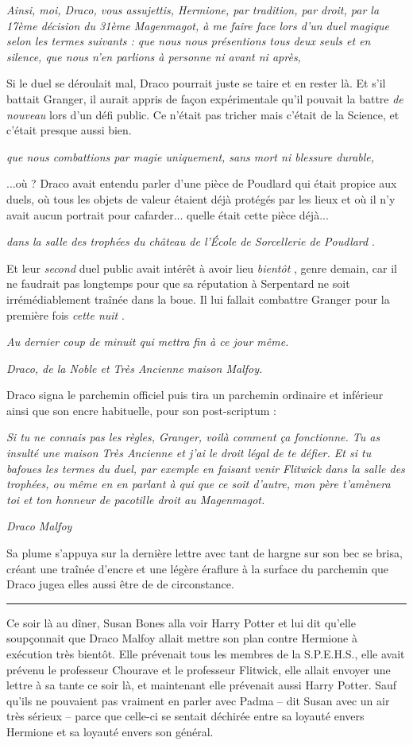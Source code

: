 \emph{Ainsi, moi, Draco, vous assujettis, Hermione, par tradition, par droit, par la 17ème décision du 31ème Magenmagot, à me faire face lors d'un duel magique selon les termes suivants : que nous nous présentions tous deux seuls et en silence, que nous n'en parlions à personne ni avant ni après,} 

Si le duel se déroulait mal, Draco pourrait juste se taire et en rester là. Et s'il battait Granger, il aurait appris de façon expérimentale qu'il pouvait la battre \emph{de nouveau}  lors d'un défi public. Ce n'était pas tricher mais c'était de la Science, et c'était presque aussi bien.

\emph{que nous combattions par magie uniquement, sans mort ni blessure durable,} 

...où ? Draco avait entendu parler d'une pièce de Poudlard qui était propice aux duels, où tous les objets de valeur étaient déjà protégés par les lieux et où il n'y avait aucun portrait pour cafarder... quelle était cette pièce déjà...

\emph{dans la salle des trophées du château de l'École de Sorcellerie de Poudlard} .

Et leur \emph{second}  duel public avait intérêt à avoir lieu \emph{bientôt} , genre demain, car il ne faudrait pas longtemps pour que sa réputation à Serpentard ne soit irrémédiablement traînée dans la boue. Il lui fallait combattre Granger pour la première fois \emph{cette nuit} .

\emph{Au dernier coup de minuit qui mettra fin à ce jour même.} 

\emph{Draco, de la Noble et Très Ancienne maison Malfoy.} 

Draco signa le parchemin officiel puis tira un parchemin ordinaire et inférieur ainsi que son encre habituelle, pour son post-scriptum :

\emph{Si tu ne connais pas les règles, Granger, voilà comment ça fonctionne. Tu as insulté une maison Très Ancienne et j'ai le droit légal de te défier. Et si tu bafoues les termes du duel, par exemple en faisant venir Flitwick dans la salle des trophées, ou même en en parlant à qui que ce soit d'autre, mon père t'amènera toi et ton honneur de pacotille droit au Magenmagot.} 

\emph{Draco Malfoy} 

Sa plume s'appuya sur la dernière lettre avec tant de hargne sur son bec se brisa, créant une traînée d'encre et une légère éraflure à la surface du parchemin que Draco jugea elles aussi être de de circonstance.
\par\noindent\rule{\textwidth}{0.4pt}
Ce soir là au dîner, Susan Bones alla voir Harry Potter et lui dit qu'elle soupçonnait que Draco Malfoy allait mettre son plan contre Hermione à exécution très bientôt. Elle prévenait tous les membres de la S.P.E.H.S., elle avait prévenu le professeur Chourave et le professeur Flitwick, elle allait envoyer une lettre à sa tante ce soir là, et maintenant elle prévenait aussi Harry Potter. Sauf qu'ils ne pouvaient pas vraiment en parler avec Padma – dit Susan avec un air très sérieux – parce que celle-ci se sentait déchirée entre sa loyauté envers Hermione et sa loyauté envers son général.

